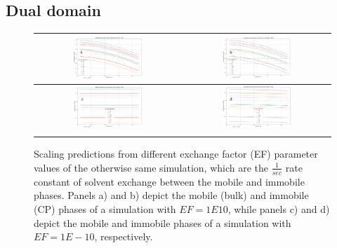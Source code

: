 \subsection{Dual domain}

\begin{figure}[h!]
    \centering
    \begin{tabular}{c|c}
        \includegraphics[width=0.49\textwidth]{images/sensitivity_analyses/EF/mobile_large_ef.png} &
        \includegraphics[width=0.49\textwidth]{images/sensitivity_analyses/EF/immobile_large_ef.png} \\ \midrule
        \includegraphics[width=0.49\textwidth]{images/sensitivity_analyses/EF/mobile_small_ef.png} & 
        \includegraphics[width=0.49\textwidth]{images/sensitivity_analyses/EF/immobile_small_ef.png} \\ \bottomrulerule
    \end{tabular}
    \caption{
        Scaling predictions from different exchange factor (EF) parameter values of the otherwise same simulation, which are the $\frac{1}{sec}$ rate constant of solvent exchange between the mobile and immobile phases. Panels a) and b) depict the mobile (bulk) and immobile (CP) phases of a simulation with $EF=1E10$, while panels c) and d) depict the mobile and immobile phases of a simulation with $EF=1E-10$, respectively.
    }
    \label{ef_values}
\end{figure}

